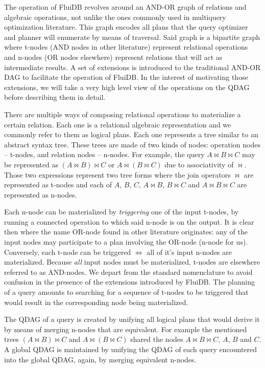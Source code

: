 The operation of FluiDB revolves around an AND-OR graph of relations
and algebraic operations, not unlike the ones commonly used in multiquery
optimization literature. This graph encodes all plans that the query
optimizer and planner will enumerate by means of traversal. Said graph is a bipartite
graph where t-nodes (AND nodes in other literature) represent
relational operations and n-nodes (OR nodes elsewhere) represent
relations that will act as intermediate results.
A set of extensions is introduced to the traditional AND-OR DAG to
facilitate the operation of FluiDB. In the interest of motivating those
extensions, we will take a very high level view of the operations on the QDAG
before describing them in detail.

There are multiple ways of composing relational operations to
  materialize a certain relation. Each one is a relational algebraic
  representation and we commonly refer to them as logical plans. Each
  one represents a tree similar to an abstract syntax tree. These
  trees are made of two kinds of nodes: operation nodes -- t-nodes, and
  relation nodes -- n-nodes. For example, the query \(A \Join B \Join C\)
  may be represented as \((A \Join B) \Join C\) or
  \(A \Join (B \Join C)\) due to associativity of \(\Join\). Those two expressions
  represent two tree forms where the join operators \(\Join\) are
  represented as t-nodes and each of \(A\), \(B\), \(C\),
  \(A \Join B\), \(B \Join C\) and \(A \Join B \Join C\) are
  represented as n-nodes.

Each n-node can be materialized by \emph{triggering} one of the input
  t-nodes, by running a connected operation to which
  said n-node is on the output. It is clear then where the name
  OR-node found in other literature originates: any of the input nodes
  may participate to a plan involving the OR-node (n-node for
  us). Conversely, each t-node can be triggered \(\iff\) all of it's input
  n-nodes are materialized. Because \emph{all} input nodes must be
  materialized, t-nodes are elsewhere referred to as AND-nodes. We depart from
  the standard nomenclature to avoid confusion in the presence of the extensions
  introduced by FluiDB. The planning of a query amounts to searching for a sequence of t-nodes to be
triggered that would result in the corresponding node being materialized.

The QDAG of a query is created by unifying all logical plans
that would derive it by means of
  merging n-nodes that are equivalent. For example the mentioned trees
  \((A \Join B) \Join C\) and \(A \Join (B \Join C)\) shared the nodes
  \(A \Join B \Join C\), \(A\), \(B\) and \(C\). A global QDAG is maintained by
  unifying the QDAG of each query encountered into the global QDAG, again,
  by merging equivalent n-nodes.

